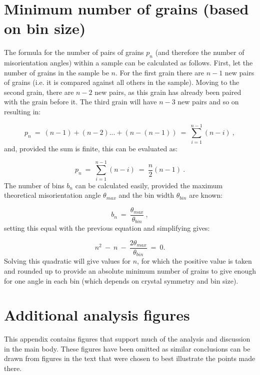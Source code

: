 \documentclass[a4paper,12pt,twoside]{report}
\numberwithin{equation}{chapter}
\begin{document}
\section{Minimum number of grains (based on bin size)} \label{App:min_no_grains}
The formula for the number of pairs of grains $p_n$ (and therefore the number of misorientation angles) within a sample can be calculated as follows. First, let the number of grains in the sample be $n$. For the first grain there are $n - 1$ new pairs of grains (i.e. it is compared against all others in the sample). Moving to the second grain, there are $n - 2$ new pairs, as this grain has already been paired with the grain before it. The third grain will have $n - 3$ new pairs and so on resulting in:

\begin{equation}
p_n\ =\ (n-1) + (n-2) ... + (n - (n-1))\ =\ \sum_{i=1}^{n-1} (n - i)\ ,
\end{equation}   
\noindent
and, provided the sum is finite, this can be evaluated as:

\begin{equation}
p_n\ =\ \sum^{n-1}_{i=1}(n - i)\ =\ \frac{n}{2}(n-1)\ .
\end{equation}
\noindent
The number of bins $b_n$ can be calculated easily, provided the maximum theoretical misorientation angle $\theta_{max}$ and the bin width $\theta_{bin}$ are known:

\begin{equation} \label{App:eq:nbins}
b_n\ =\ \frac{\theta_{max}}{\theta_{bin}}\ ,
\end{equation}
\noindent
setting this equal with the previous equation and simplifying gives:

\begin{equation}
n^2\ -\ n\ -\ \frac{2\theta_{max}}{\theta_{bin}}\ =\ 0.
\end{equation}
\noindent
Solving this quadratic will give values for $n$, for which the positive value is taken and rounded up to provide an absolute minimum number of grains to give enough for one angle in each bin (which depends on crystal symmetry and bin size).


\section{Additional analysis figures} \label{App:analysis_figs}
This appendix contains figures that support much of the analysis and discussion in the main body. These figures have been omitted as similar conclusions can be drawn from figures in the text that were chosen to best illustrate the points made there. 
\end{document}

